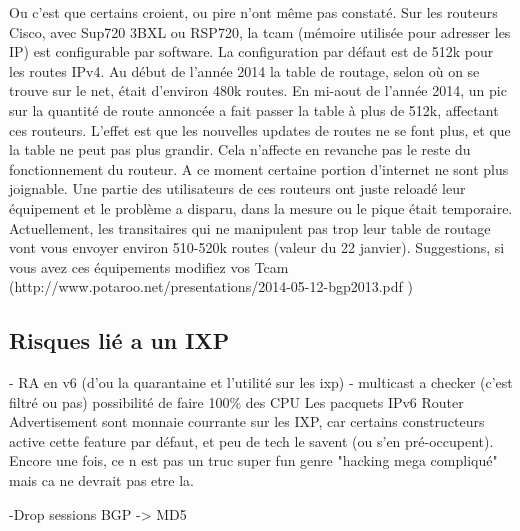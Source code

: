 Ou c’est que certains croient, ou pire n’ont même pas constaté. Sur les routeurs Cisco, avec Sup720 3BXL ou RSP720, la tcam (mémoire utilisée pour adresser les IP) est configurable par software. La configuration par défaut est de 512k pour les routes IPv4. Au début de l’année 2014 la table de routage, selon où on se trouve sur le net, était d’environ 480k routes. En mi-aout de l’année 2014, un pic sur la quantité de route annoncée a fait passer la table à plus de 512k, affectant ces routeurs. L’effet est que les nouvelles updates de routes ne se font plus, et que la table ne peut pas plus grandir. Cela n’affecte en revanche pas le reste du fonctionnement du routeur. A ce moment certaine portion d’internet ne sont plus joignable. Une partie des utilisateurs de ces routeurs ont juste reloadé leur équipement et le problème a disparu, dans la mesure ou le pique était temporaire. 
Actuellement, les transitaires qui ne manipulent pas trop leur table de routage vont vous envoyer environ 510-520k routes (valeur du 22 janvier).  Suggestions, si vous avez ces équipements modifiez vos Tcam (http://www.potaroo.net/presentations/2014-05-12-bgp2013.pdf )


\subsection{Risques lié a un IXP}
- RA en v6 (d'ou la quarantaine et l'utilité sur les ixp)
- multicast a checker (c'est filtré ou pas) possibilité de faire 100\% des CPU
Les pacquets IPv6 Router Advertisement sont monnaie courrante sur les IXP, car certains constructeurs active cette feature par défaut, et peu de tech le savent (ou s'en pré-occupent).
Encore une fois, ce n est pas un truc super fun genre "hacking mega compliqué" mais ca ne devrait pas etre la.


-Drop sessions BGP -> MD5
\subsection{}
\subsection{}


